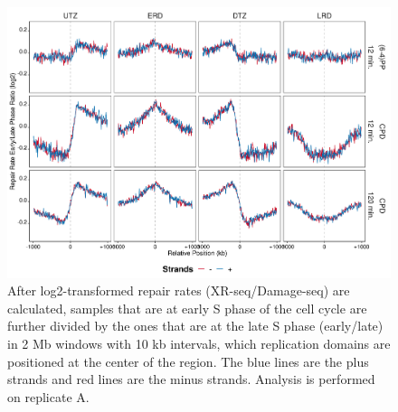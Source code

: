 \begin{figure}[H]
\begin{center}
\includegraphics[width=\textwidth]{Chapters/7_appendix/figures/supfig28}
\caption[Repair rate early/late phase ratio of replication domains in 2 Mb (replicate A).]{After log2-transformed repair rates (XR-seq/Damage-seq) are calculated, samples that are at early S phase of the cell cycle are further divided by the ones that are at the late S phase (early/late) in 2 Mb windows with 10 kb intervals, which replication domains are positioned at the center of the region. The blue lines are the plus strands and red lines are the minus strands. Analysis is performed on replicate A.}
\label{supfig:rrel2000repdomainA}
\end{center}
\end{figure}

